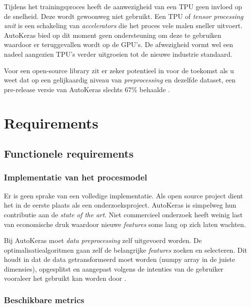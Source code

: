 Tijdens het trainingsproces heeft de aanwezigheid van een TPU geen invloed op de snelheid. Deze wordt gewoonweg niet gebruikt. Een TPU of \textit{tensor processing unit} is een schakeling van \textit{accelerators} die het proces vele malen sneller uitvoert. AutoKeras bied op dit moment geen ondersteuning om deze te gebruiken waardoor er teruggevallen wordt op de GPU's. De afwezigheid vormt wel een nadeel aangezien TPU's verder uitgroeien tot de nieuwe industrie standaard.

Voor een open-source library zit er zeker potentieel in voor de toekomst als u weet dat op een gelijkaardig niveau van \textit{preprocessing} en dezelfde dataset, een pre-release versie van AutoKeras slechts 67\% behaalde \autocite{Chopra2019}.

\section{Requirements}

\subsection{Functionele requirements}
\label{subsec:autokeras-fr}

\subsubsection{Implementatie van het procesmodel}
\label{sucsubsec:autokeras-fr-procesmodel}

Er is geen sprake van een volledige implementatie. Als open source project dient het in de eerste plaats als een onderzoeksproject. AutoKeras is simpelweg hun contributie aan de \textit{state of the art}. Niet commercieel onderzoek heeft weinig last van economische druk waardoor nieuwe \textit{features} soms lang op zich laten wachten. 

Bij AutoKeras moet \textit{data preprocessing} zelf uitgevoerd worden. De optimalisatiealgoritmen gaan zelf de belangrijke \textit{features} zoeken en selecteren. Dit houdt in dat de data getransformeerd moet worden (numpy array in de juiste dimensies), opgesplitst en aangepast volgens de intenties van de gebruiker vooraleer het gebruikt kan worden door .

\subsubsection{Beschikbare metrics}
\label{sucsubsec:autokeras-fr-metrics}

